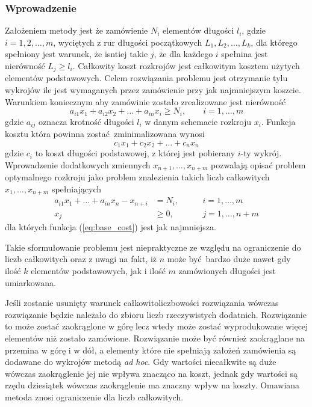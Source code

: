 \subsubsection{Wprowadzenie}
Założeniem metody jest że zamówienie $N_i$ elementów długości $l_i$, gdzie $i=1,2,\dots,m$, wyciętych z rur długości początkowych $L_1, L_2, \dots, L_k$, dla którego spełniony jest warunek, że isntiej takie $j$, że dla każdego $i$ spełnina jest nierówność $L_j \ge l_i$. Całkowity koszt rozkrojów jest całkowitym kosztem użytych elementów podstawowych. Celem rozwiązania problemu jest otrzymanie tylu wykrojów ile jest wymaganych przez zamówienie przy jak najmniejszym koszcie. Warunkiem koniecznym aby zamówinie zostało zrealizowane jest nierówność
\begin{equation*}
a_{i1}x_1 + a_{i2}x_2 + \dots + a_{in}x_i \ge N_i, \qquad i = 1, \dots, m
\end{equation*}
gdzie $a_{ij}$ oznacza krotność długości $l_i$ w danym schemacie rozkroju $x_i$. Funkcja kosztu która powinna zostać zminimalizowana wynosi
\begin{equation}\label{eq:base_cost}
  c_1x_1 + c_2x_2+\dots+c_nx_n
\end{equation}
gdzie  $c_i$ to koszt długości podstawowej, z której jest pobierany $i$-ty wykrój. Wprowadzenie dodatkowych zmiennych $x_{n+1},\dots,x_{n+m}$ pozwalają opisać problem optymalnego rozkroju jako problem znalezienia takich liczb całkowitych $x_1,\dots,x_{n+m}$ spełniających
\begin{align}
    a_{i1}x_1+\dots+a_{in}x_n-x_{n+i} & =N_i, & \qquad i=1,\dots,m  \label{eq:additional_base}\\
    x_j & \ge 0, & \qquad j=1,\dots,n+m \label{eq:additional_base_condition}
\end{align}
dla których funkcja (\ref{eq:base_cost}) jest jak najmniejsza.

Takie sformułowanie problemu jest niepraktyczne ze względu na ograniczenie do liczb całkowitych oraz z uwagi na fakt, iż $n$ może być bardzo duże nawet gdy ilość $k$ elementów podstawowych, jak i ilość $m$ zamówionych długości jest umiarkowana.

Jeśli zostanie usunięty warunek całkowitoliczbowości rozwiązania wówczas rozwiązanie będzie należało do zbioru liczb rzeczywistych dodatnich. Rozwiązanie to może zostać zaokrąglone w górę lecz wtedy może zostać wyprodukowane więcej elementów niż zostało zamówione. Rozwiązanie może być również zaokrąglane na przemina w górę i w dół, a elementy które nie spełniają założeń zamówienia są dodawane do wykrojów metodą \textit{ad hoc}. Gdy wartości niecałkwite są duże wówczas zaokrąglenie jej nie wpływa znacząco na koszt, jednak gdy wartości są rzędu dziesiątek wówczas zaokrąglenie ma znaczny wpływ na koszty. Omawiana metoda znosi ograniczenie dla liczb całkowitych.

